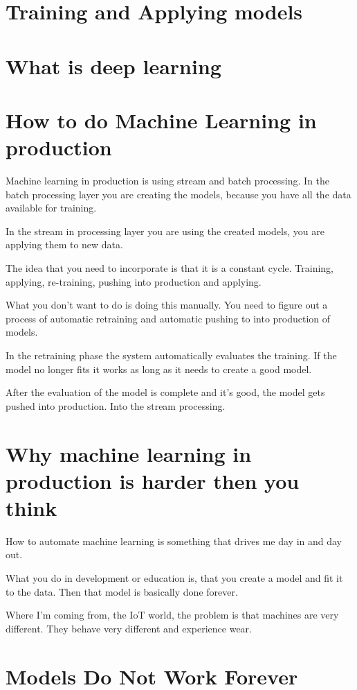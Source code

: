 \documentclass[12pt, numbers=noenddot]{scrreprt} %
\begin{document}
\section{Training and Applying models}
\section{What is deep learning}
\section{How to do Machine Learning in production}
Machine learning in production is using stream and batch processing. In the batch processing layer you are creating the models, because you have all the data available for training.

In the stream in processing layer you are using the created models, you are applying them to new data.

The idea that you need to incorporate is that it is a constant cycle. Training, applying, re-training, pushing into production and applying.

What you don’t want to do is doing this manually. You need to figure out a process of automatic retraining and automatic pushing to into production of models.

In the retraining phase the system automatically evaluates the training. If the model no longer fits it works as long as it needs to create a good model.

After the evaluation of the model is complete and it’s good, the model gets pushed into production. Into the stream processing.

\section{Why machine learning in production is harder then you think}
How to automate machine learning is something that drives me day in and day out.

What you do in development or education is, that you create a model and fit it to the data. Then that model is basically done forever.

Where I’m coming from, the IoT world, the problem is that machines are very different. They behave very different and experience wear.

\section{Models Do Not Work Forever}
\end{document}
